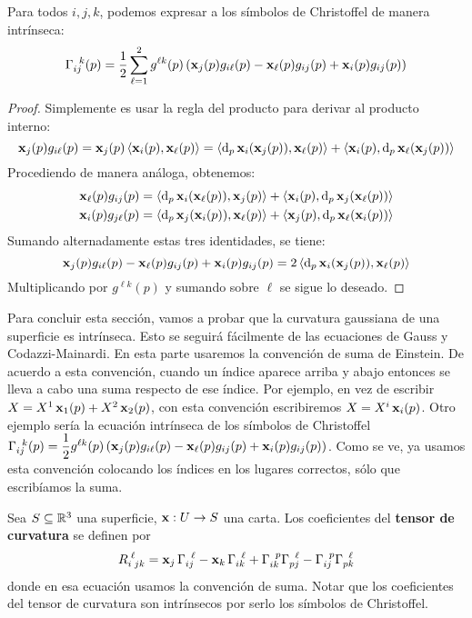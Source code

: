 \begin{prop}
Para todos $i,j,k$, podemos expresar a los símbolos de Christoffel de manera intrínseca: $$\Gamma_{ij}^{\;\;k}(p)=\dfrac{1}{2}\displaystyle\sum_{\ell=1}^2 g^{\ell k}(p)\left(\x_j(p) g_{i\ell}(p)-\x_\ell(p) g_{ij}(p)+\x_i(p) g_{ij}(p)\right)$$
\begin{proof}
Simplemente es usar la regla del producto para derivar al producto interno: $$\x_j(p) g_{i\ell}(p) = \x_j(p)\pint{\x_i(p),\x_\ell(p)} = \pint{\diff_p\x_i(\x_j(p)),\x_\ell(p)}+\pint{\x_i(p),\diff_p\x_\ell(\x_j(p))}$$ Procediendo de manera análoga, obtenemos: \begin{align*}\x_\ell(p) g_{ij}(p)&= \pint{\diff_p\x_i(\x_\ell(p)),\x_j(p)}+\pint{\x_i(p),\diff_p\x_j(\x_\ell(p))} \\ \x_i(p) g_{j\ell}(p)&= \pint{\diff_p\x_j(\x_i(p)),\x_\ell(p)}+\pint{\x_j(p),\diff_p\x_\ell(\x_i(p))}\end{align*} Sumando alternadamente estas tres identidades, se tiene: $$\x_j(p) g_{i\ell}(p)-\x_\ell(p) g_{ij}(p)+\x_i(p) g_{ij}(p) = 2\pint{\diff_p\x_i(\x_j(p)),\x_\ell(p)}$$ Multiplicando por $g^{\ell k}(p)$ y sumando sobre $\ell$ se sigue lo deseado.
\end{proof}
\end{prop}

Para concluir esta sección, vamos a probar que la curvatura gaussiana de una superficie es intrínseca. Esto se seguirá fácilmente de las ecuaciones de Gauss y Codazzi-Mainardi. En esta parte usaremos la convención de suma de Einstein. De acuerdo a esta convención, cuando un índice aparece arriba y abajo entonces se lleva a cabo una suma respecto de ese índice. Por ejemplo, en vez de escribir $X=X^1\x_1(p)+X^2\x_2(p)$, con esta convención escribiremos $X=X^i\x_i(p)$. Otro ejemplo sería la ecuación intrínseca de los símbolos de Christoffel $\Gamma_{ij}^{\;\;k}(p)=\dfrac{1}{2} g^{\ell k}(p)\left(\x_j(p) g_{i\ell}(p)-\x_\ell(p) g_{ij}(p)+\x_i(p) g_{ij}(p)\right)$. Como se ve, ya usamos esta convención colocando los índices en los lugares correctos, sólo que escribíamos la suma.

\begin{defn}
Sea $S\subseteq\RR^3$ una superficie, $\x:U\to S$ una carta. Los coeficientes del \textbf{tensor de curvatura} se definen por $$R_{i\; jk}^{\;\ell} = \x_j\Gamma_{ij}^{\;\;\ell} - \x_k\Gamma_{ik}^{\;\;\ell}+ \Gamma_{ik}^{\;\; p}\Gamma_{pj}^{\;\;\ell}-\Gamma_{ij}^{\;\; p}\Gamma_{pk}^{\;\;\ell}$$
donde en esa ecuación usamos la convención de suma. Notar que los coeficientes del tensor de curvatura son intrínsecos por serlo los símbolos de Christoffel.
\end{defn}

